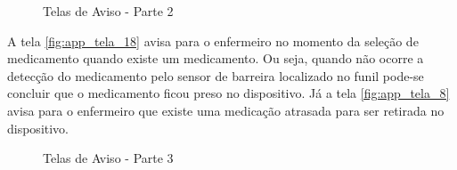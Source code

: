 \begin{apendicesenv}
\begin{figure}[H]
    \centering
    \caption{Telas de Aviso - Parte 2}\label{fig:telas_17_19_20}
\end{figure}

A tela \ref{fig:app_tela_18} avisa para o enfermeiro no momento da seleção de medicamento quando existe um medicamento. Ou seja, quando não ocorre a detecção do medicamento pelo sensor de barreira localizado no funil pode-se concluir que o medicamento ficou preso no dispositivo. Já a tela \ref{fig:app_tela_8} avisa para o enfermeiro que existe uma medicação atrasada para ser retirada no dispositivo.

\begin{figure}[H]
    \centering
    \caption{Telas de Aviso - Parte 3}\label{fig:telas_18_8}
\end{figure}



\end{apendicesenv}
